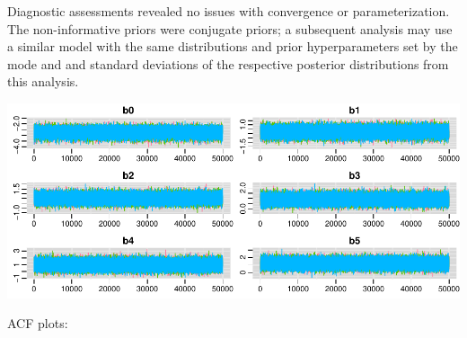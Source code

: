 \documentclass[12pt]{article}
\begin{document}
Diagnostic assessments revealed no issues with convergence or parameterization. The non-informative priors were conjugate priors; a subsequent analysis may use a similar model with the same distributions and prior hyperparameters set by the mode and and standard deviations of the respective posterior distributions from this analysis.

\begin{center}\includegraphics{bookdown_report_files/figure-latex/trace-1} \end{center}

ACF plots:\\
\end{document}
